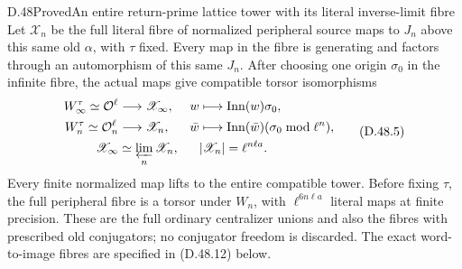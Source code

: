 \begin{statement}{D.48}{Proved}{An entire return-prime lattice tower with its literal inverse-limit fibre}
Let \(\mathscr X_n\) be the full literal fibre of
normalized peripheral source maps to \(J_n\) above
this same old \(\alpha\), with \(\tau\) fixed.
Every map in the fibre is generating and factors
through an automorphism of this same \(J_n\).
After choosing one origin \(\sigma_0\) in the
infinite fibre, the actual maps give compatible
torsor isomorphisms
\[
 \begin{aligned}
 W_\infty^\tau\simeq\mathcal O^\ell
       &\longrightarrow\mathscr X_\infty,
       &w&\longmapsto\operatorname{Inn}(w)\sigma_0,\\
 W_n^\tau\simeq\mathcal O_n^\ell
       &\longrightarrow\mathscr X_n,
       &\bar w&\longmapsto
          \operatorname{Inn}(\bar w)(\sigma_0\bmod\ell^n),\\
 \mathscr X_\infty&\simeq\varprojlim_n\mathscr X_n,
       &&|\mathscr X_n|=\ell^{n\ell a}.
 \end{aligned}
 \tag{D.48.5}
\]
Every finite normalized map lifts to the entire
compatible tower. Before fixing \(\tau\), the full
peripheral fibre is a torsor under \(W_n\), with
\(\ell^{6n\ell a}\) literal maps at finite precision.
These are the full ordinary centralizer unions and
also the fibres with prescribed old conjugators;
no conjugator freedom is discarded.
The exact word-to-image fibres are specified in
\textup{(D.48.12)} below.
\end{statement}

